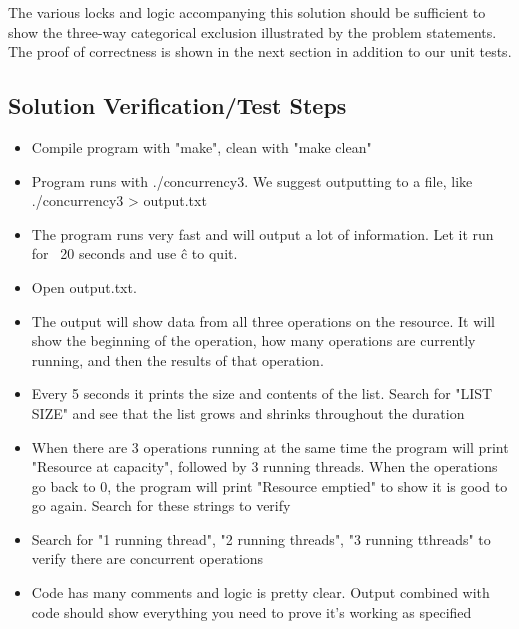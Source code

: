 \documentclass[onecolumn, draftclsnofoot,10pt, compsoc]{IEEEtran}
\begin{document}
\begin{singlespace}
    The various locks and logic accompanying this solution should be sufficient to show the three-way categorical exclusion illustrated by the problem statements. The proof of correctness is shown in the next section in addition to our unit tests. 

\subsection*{Solution Verification/Test Steps}
\begin{itemize}
    \item Compile program with "make", clean with "make clean"
    \item Program runs with ./concurrency3. We suggest outputting to a file, like ./concurrency3 > output.txt
    \item The program runs very fast and will output a lot of information. Let it run for ~20 seconds and use \^c to quit.
    \item Open output.txt.
    \item The output will show data from all three operations on the resource. It will show the beginning of the operation, how many operations are currently running, and then the results of that operation.
    \item Every 5 seconds it prints the size and contents of the list. Search for "LIST SIZE" and see that the list grows and shrinks throughout the duration
    \item When there are 3 operations running at the same time the program will print "Resource at capacity", followed by 3 running threads. When the operations go back to 0, the program will print "Resource emptied" to show it is good to go again. Search for these strings to verify
    \item Search for "1 running thread", "2 running threads", "3 running tthreads" to verify there are concurrent operations
    \item Code has many comments and logic is pretty clear. Output combined with code should show everything you need to prove it's working as specified
\end{itemize}

\end{singlespace}
\end{document}
